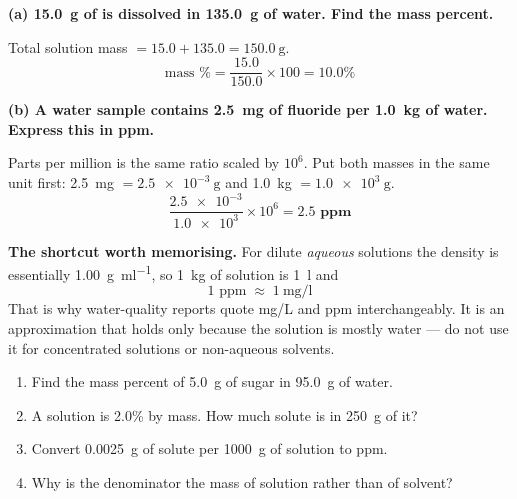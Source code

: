 \documentclass{apchem-worksheet}
\begin{document}
\begin{workedexample}
\textbf{(a) \SI{15.0}{\gram} of  is dissolved in
\SI{135.0}{\gram} of water. Find the mass percent.}

Total solution mass $= 15.0 + 135.0 = \SI{150.0}{\gram}$.
\[ \text{mass \%} = \frac{15.0}{150.0} \times 100
                  = \mathbf{10.0\%} \]

\textbf{(b) A water sample contains \SI{2.5}{\milli\gram} of fluoride
per \SI{1.0}{\kilo\gram} of water. Express this in ppm.}

Parts per million is the same ratio scaled by $10^{6}$. Put both masses
in the same unit first: \SI{2.5}{\milli\gram} $=
\SI{2.5e-3}{\gram}$ and \SI{1.0}{\kilo\gram} $= \SI{1.0e3}{\gram}$.
\[ \frac{\num{2.5e-3}}{\num{1.0e3}} \times 10^{6}
   = \mathbf{2.5 \text{ ppm}} \]

\textbf{The shortcut worth memorising.} For dilute \emph{aqueous}
solutions the density is essentially \SI{1.00}{\gram\per\milli\litre},
so \SI{1}{\kilo\gram} of solution is \SI{1}{\litre} and
\[ 1 \text{ ppm} \;\approx\; \SI{1}{\milli\gram\per\litre} \]
That is why water-quality reports quote mg/L and ppm interchangeably.
It is an approximation that holds only because the solution is mostly
water --- do not use it for concentrated solutions or non-aqueous
solvents.
\end{workedexample}

\begin{yourturn}
\begin{enumerate}[leftmargin=*,itemsep=0.5em]
  \item Find the mass percent of \SI{5.0}{\gram} of sugar in
        \SI{95.0}{\gram} of water. \workspace[1.6cm]
  \item A solution is 2.0\% by mass. How much solute is in
        \SI{250}{\gram} of it? \workspace[1.6cm]
  \item Convert \SI{0.0025}{\gram} of solute per \SI{1000}{\gram} of
        solution to ppm. \workspace[1.6cm]
  \item Why is the denominator the mass of solution rather than of
        solvent? \workspace[1.6cm]
\end{enumerate}
\end{yourturn}
\end{document}
